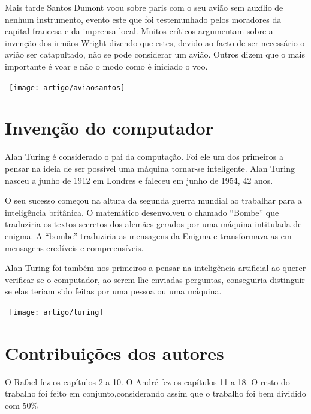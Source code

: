 \documentclass{report}
\begin{document}
\pagebreak

Mais tarde Santos Dumont voou sobre paris com o seu avião sem auxílio de nenhum instrumento, evento este que foi testemunhado pelos moradores da capital francesa e da imprensa local.
Muitos críticos argumentam sobre a invenção dos irmãos Wright dizendo que estes, devido ao facto de ser necessário o avião ser catapultado, não se pode considerar um avião. Outros dizem que o mais importante é voar e não o modo como é iniciado o voo. 

\begin{center}
\ \texttt{[image: artigo/aviaosantos]}
\end{center}
 \begin{figure}[h]
 	\centerline{}
 \end{figure}





\chapter{Invenção do computador}
Alan Turing é considerado o pai da computação. Foi ele um dos primeiros a pensar na ideia de ser possível uma máquina tornar-se inteligente.
Alan Turing nasceu a junho de 1912 em Londres e faleceu em junho de 1954, 42 anos.

O seu sucesso começou na altura da segunda guerra mundial ao trabalhar para a inteligência britânica. O matemático desenvolveu o chamado “Bombe” que traduziria os textos secretos dos alemães gerados por uma máquina intitulada de enigma. A “bombe” traduziria as mensagens da Enigma e transformava-as em mensagens credíveis e compreensíveis.

Alan Turing foi também nos primeiros a pensar na inteligência artificial ao querer verificar se o computador, ao serem-lhe enviadas perguntas, conseguiria distinguir se elas teriam sido feitas por uma pessoa ou uma máquina.
\begin{center}
\ \texttt{[image: artigo/turing]}
\end{center}
 \begin{figure}[h]
 	\centerline{}
 \end{figure}

  



\chapter*{Contribuições dos autores}
O Rafael fez os capítulos 2 a 10.
O André fez os capítulos 11 a 18.
O resto do trabalho foi feito em conjunto,considerando assim que o trabalho foi bem dividido com 50\%
\end{document}
